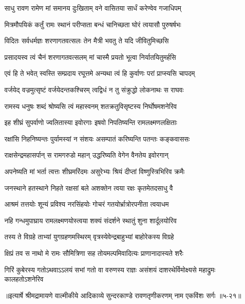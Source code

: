 \twolineshloka
{साधु रावण रामेण मां समानय दुःखिताम्}
{वने वासितया सार्धं करेण्वेव गजाधिपम्} %

\twolineshloka
{मित्रमौपयिकं कर्तुं रामः स्थानं परीप्सता}
{बन्धं चानिच्छता घोरं त्वयासौ पुरुषर्षभः} %

\twolineshloka
{विदितः सर्वधर्मज्ञः शरणागतवत्सलः}
{तेन मैत्री भवतु ते यदि जीवितुमिच्छसि} %

\twolineshloka
{प्रसादयस्व त्वं चैनं शरणागतवत्सलम्}
{मां चास्मै प्रयतो भूत्वा निर्यातयितुमर्हसि} %

\twolineshloka
{एवं हि ते भवेत् स्वस्ति सम्प्रदाय रघूत्तमे}
{अन्यथा त्वं हि कुर्वाणः परां प्राप्स्यसि चापदम्} %

\twolineshloka
{वर्जयेद् वज्रमुत्सृष्टं वर्जयेदन्तकश्चिरम्}
{त्वद्विधं न तु संक्रुद्धो लोकनाथः स राघवः} %

\twolineshloka
{रामस्य धनुषः शब्दं श्रोष्यसि त्वं महास्वनम्}
{शतक्रतुविसृष्टस्य निर्घोषमशनेरिव} %

\twolineshloka
{इह शीघ्रं सुपर्वाणो ज्वलितास्या इवोरगाः}
{इषवो निपतिष्यन्ति रामलक्ष्मणलक्षिताः} %

\twolineshloka
{रक्षांसि निहनिष्यन्तः पुर्यामस्यां न संशयः}
{असम्पातं करिष्यन्ति पतन्तः कङ्कवाससः} %

\twolineshloka
{राक्षसेन्द्रमहासर्पान् स रामगरुडो महान्}
{उद्धरिष्यति वेगेन वैनतेय इवोरगान्} %

\twolineshloka
{अपनेष्यति मां भर्ता त्वत्तः शीघ्रमरिंदमः}
{असुरेभ्यः श्रियं दीप्तां विष्णुस्त्रिभिरिव क्रमैः} %

\twolineshloka
{जनस्थाने हतस्थाने निहते रक्षसां बले}
{अशक्तेन त्वया रक्षः कृतमेतदसाधु वै} %

\twolineshloka
{आश्रमं तत्तयोः शून्यं प्रविश्य नरसिंहयोः}
{गोचरं गतयोर्भ्रात्रोरपनीता त्वयाधम} %

\twolineshloka
{नहि गन्धमुपाघ्राय रामलक्ष्मणयोस्त्वया}
{शक्यं संदर्शने स्थातुं शुना शार्दूलयोरिव} %

\twolineshloka
{तस्य ते विग्रहे ताभ्यां युगग्रहणमस्थिरम्}
{वृत्रस्येवेन्द्रबाहुभ्यां बाहोरेकस्य विग्रहे} %

\twolineshloka
{क्षिप्रं तव स नाथो मे रामः सौमित्रिणा सह}
{तोयमल्पमिवादित्यः प्राणानादास्यते शरैः} %

\twolineshloka
{गिरिं कुबेरस्य गतोऽथवाऽऽलयं सभां गतो वा वरुणस्य राज्ञः}
{असंशयं दाशरथेर्विमोक्ष्यसे महाद्रुमः कालहतोऽशनेरिव} %


॥इत्यार्षे श्रीमद्रामायणे वाल्मीकीये आदिकाव्ये सुन्दरकाण्डे रावणतृणीकरणम् नाम एकविंशः सर्गः ॥५-२१॥
